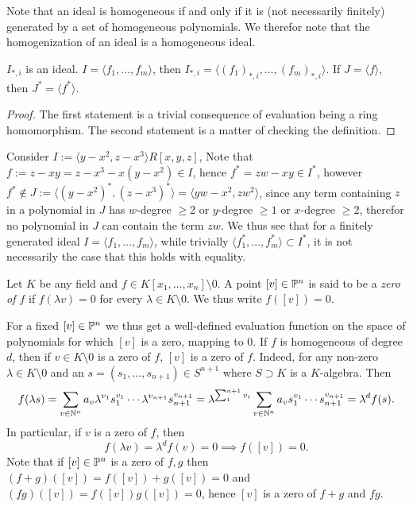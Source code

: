 \begin{remark}
    Note that an ideal is homogeneous if and only if it is (not necessarily finitely) generated by a set of homogeneous polynomials. We therefor note that the homogenization of an ideal is a homogeneous ideal.
\end{remark}
\begin{lemma}
    $I_{\ast,i}$ is an ideal. $I=\langle f_1,\dots,f_m\rangle$, then $I_{\ast,i} = \langle (f_1)_{\ast,i},\dots, (f_m)_{\ast,i}\rangle$. If $J=\langle f\rangle$, then $J^\ast = \langle f^\ast\rangle$. 
\end{lemma}
\begin{proof}
    The first statement is a trivial consequence of evaluation being a ring homomorphism. The second statement is a matter of checking the definition.
\end{proof}
\begin{example}\label{HomogenizationPathology}
    Consider $I:=\langle y-x^2,z-x^3\rangle R[x,y,z]$, Note that $f:=z-xy=z-x^3-x(y-x^2)\in I$, hence $f^\ast = zw-xy \in I^\ast$, however $f^\ast \notin J:= \langle (y-x^2)^\ast,(z-x^3)^\ast\rangle =\langle yw-x^2,zw^2\rangle$, since any term containing $z$ in a polynomial in $J$ has $w$-degree $\geq 2$ or $y$-degree $\geq 1$ or $x$-degree $\geq 2$, therefor no polynomial in $J$ can contain the term $zw$. We thus see that for a finitely generated ideal $I=\langle f_1,\dots,f_m\rangle$, while trivially $\langle f_1^\ast,\dots,f_m^\ast \rangle \subset I^\ast$, it is not necessarily the case that this holds with equality.
\end{example}
\begin{definition}
    Let $K$ be any field and $f\in K[x_1,\dots,x_n]\setminus0 $. A point $[v]\in \mathbb{P}^n$ is said to be a \textit{zero of $f$} if $f(\lambda v)=0$ for every $\lambda\in K\setminus 0$. We thus write $f([v])=0$.
\end{definition}
\begin{remark}
    For a fixed $[v]\in\mathbb{P}^n$ we thus get a well-defined evaluation function on the space of polynomials for which $[v]$ is a zero, mapping to $0$. If $f$ is homogeneous of degree $d$, then if $v\in K\setminus 0$ is a zero of $f$, $[v]$ is a zero of $f$. Indeed, for any non-zero $\lambda\in K\setminus 0$ and an $s=(s_1,\dots,s_{n+1})\in S^{n+1}$ where $S\supset K$ is a $K$-algebra. Then 
    $$f(\lambda s)=\sum_{v\in\mathbb{N}^n} a_v\lambda^{v_1}s_1^{v_1}\cdots \lambda^{v_{n+1}}s_{n+1}^{v_{n+1}}= \lambda^{\sum_1^{n+1} v_i}\sum_{v\in\mathbb{N}^n} a_v s_1^{v_1}\cdots s_{n+1}^{v_{n+1}}=\lambda^df(s).$$
    In particular, if $v$ is a zero of $f$, then 
    $$f(\lambda v)=\lambda^df(v)=0\implies f([v])=0.$$
    Note that if $[v]\in\mathbb{P}^n$ is a zero of $f,g$ then $(f+g)([v])=f([v])+g([v])=0$ and $(fg)([v])=f([v])g([v])=0$, hence $[v]$ is a zero of $f+g$ and $fg$.
\end{remark}

